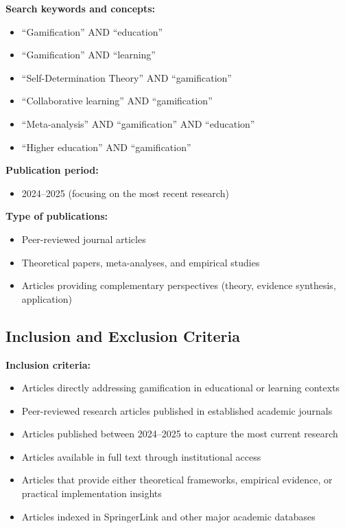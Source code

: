 \documentclass[12pt,a4paper]{article}
\begin{document}
\begin{justify}
\textbf{Search keywords and concepts:}

\begin{itemize}
    \item ``Gamification'' AND ``education''
    \item ``Gamification'' AND ``learning''
    \item ``Self-Determination Theory'' AND ``gamification''
    \item ``Collaborative learning'' AND ``gamification''
    \item ``Meta-analysis'' AND ``gamification'' AND ``education''
    \item ``Higher education'' AND ``gamification''
\end{itemize}

\textbf{Publication period:}

\begin{itemize}
    \item 2024--2025 (focusing on the most recent research)
\end{itemize}

\textbf{Type of publications:}

\begin{itemize}
    \item Peer-reviewed journal articles
    \item Theoretical papers, meta-analyses, and empirical studies
    \item Articles providing complementary perspectives (theory, evidence synthesis, application)
\end{itemize}


\subsection{Inclusion and Exclusion Criteria}

\textbf{Inclusion criteria:}

\begin{itemize}
    \item Articles directly addressing gamification in educational or learning contexts
    \item Peer-reviewed research articles published in established academic journals
    \item Articles published between 2024--2025 to capture the most current research
    \item Articles available in full text through institutional access
    \item Articles that provide either theoretical frameworks, empirical evidence, or practical implementation insights
    \item Articles indexed in SpringerLink and other major academic databases
\end{itemize}


\end{justify}
\end{document}

